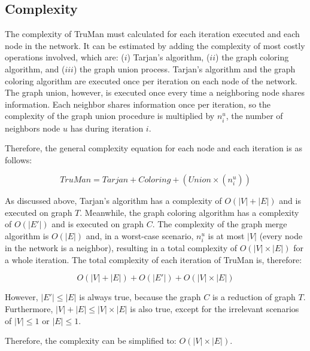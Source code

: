 \subsection{Complexity}
The complexity of TruMan must calculated for each iteration executed and each node in the network.
It can be estimated by adding the complexity of most costly operations involved, which are: ($i$) Tarjan's algorithm, ($ii$) the graph coloring algorithm, and ($iii$) the graph union process.
Tarjan's algorithm and the graph coloring algorithm are executed once per iteration on each node of the network.
The graph union, however, is executed once every time a neighboring node shares information.
Each neighbor shares information once per iteration, so the complexity of the graph union procedure is multiplied by $n^u_i$, the number of neighbors node $u$ has during iteration $i$.

Therefore, the general complexity equation for each node and each iteration is as follows:

$$ TruMan = Tarjan + Coloring + (Union\times(n^u_i)) $$

As discussed above, Tarjan's algorithm has a complexity of $O(|V|+|E|)$ and is executed on graph $T$.
Meanwhile, the graph coloring algorithm has a complexity of $O(|E'|)$ and is executed on graph $C$.
The complexity of the graph merge algorithm is $O(|E|)$ and, in a worst-case scenario, $n^u_i$ is at most $|V|$ (every node in the network is a neighbor), resulting in a total complexity of $O(|V|\times |E|)$ for a whole iteration.
The total complexity of each iteration of TruMan is, therefore:

$$ O(|V|+|E|) + O(|E'|) + O(|V|\times |E|)$$

However, $|E'| \leq |E|$ is always true, because the graph $C$ is a reduction of graph $T$.
Furthermore, $|V|+|E| \leq |V|\times |E|$ is also true, except for the irrelevant scenarios of $|V| \leq 1$ or $|E| \leq 1$.

Therefore, the complexity can be simplified to: $O(|V| \times |E|)$.


